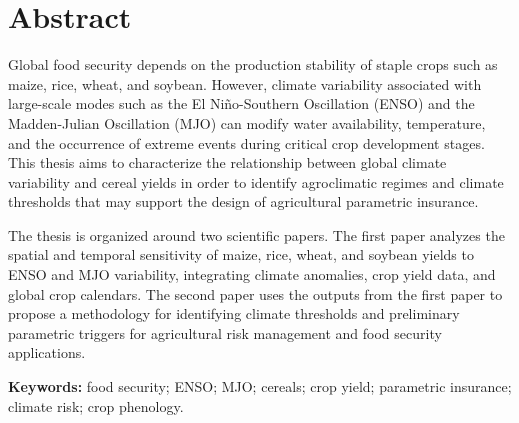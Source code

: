 \chapter*{Abstract}

Global food security depends on the production stability of staple crops such as maize, rice, wheat, and soybean. However, climate variability associated with large-scale modes such as the El Niño-Southern Oscillation (ENSO) and the Madden-Julian Oscillation (MJO) can modify water availability, temperature, and the occurrence of extreme events during critical crop development stages. This thesis aims to characterize the relationship between global climate variability and cereal yields in order to identify agroclimatic regimes and climate thresholds that may support the design of agricultural parametric insurance.

The thesis is organized around two scientific papers. The first paper analyzes the spatial and temporal sensitivity of maize, rice, wheat, and soybean yields to ENSO and MJO variability, integrating climate anomalies, crop yield data, and global crop calendars. The second paper uses the outputs from the first paper to propose a methodology for identifying climate thresholds and preliminary parametric triggers for agricultural risk management and food security applications.


\textbf{Keywords:} food security; ENSO; MJO; cereals; crop yield; parametric insurance; climate risk; crop phenology.
